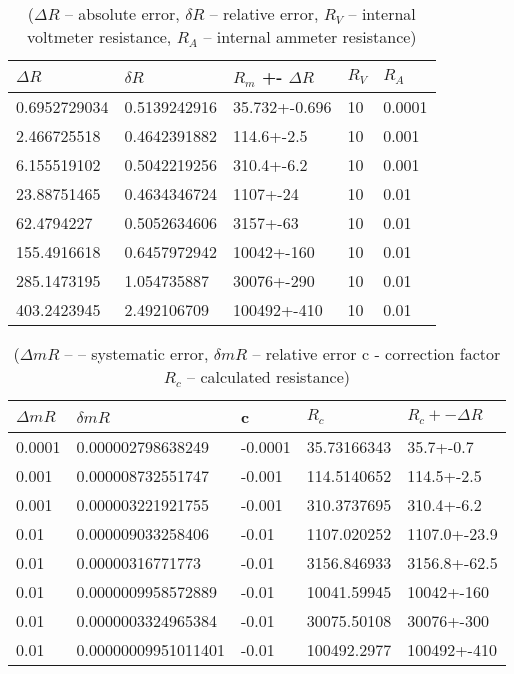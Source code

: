 \begin{table}[!ht]
    \centering
    \begin{tabular}{|l|l|l|l|l|}
    \hline
        $\Delta R$ & $\delta R$ & $R_m$ +- $\Delta R$ & $R_V$ & $R_A$ \\ \hline
        0.6952729034 & 0.5139242916 & 35.732+-0.696 & 10 & 0.0001 \\ \hline
        2.466725518 & 0.4642391882 & 114.6+-2.5 & 10 & 0.001 \\ \hline
        6.155519102 & 0.5042219256 & 310.4+-6.2 & 10 & 0.001 \\ \hline
        23.88751465 & 0.4634346724 & 1107+-24 & 10 & 0.01 \\ \hline
        62.4794227 & 0.5052634606 & 3157+-63 & 10 & 0.01 \\ \hline
        155.4916618 & 0.6457972942 & 10042+-160 & 10 & 0.01 \\ \hline
        285.1473195 & 1.054735887 & 30076+-290 & 10 & 0.01 \\ \hline
        403.2423945 & 2.492106709 & 100492+-410 & 10 & 0.01 \\ \hline
    \end{tabular}
    \caption{($\Delta R$ -- absolute error, $\delta R$ -- relative error, $R_V$ -- internal voltmeter resistance, $R_A$ -- internal ammeter resistance)}
\end{table}

\begin{table}[!ht]
    \centering
    \begin{tabular}{|l|l|l|l|l|}
    \hline
        $\Delta mR$ & $\delta mR$ & c & $R_c$ & $R_c+- \Delta R$ \\ \hline
0.0001 & 0.000002798638249 & -0.0001 & 35.73166343 & 35.7+-0.7 \\ \hline
        0.001 & 0.000008732551747 & -0.001 & 114.5140652 & 114.5+-2.5 \\ \hline
        0.001 & 0.000003221921755 & -0.001 & 310.3737695 & 310.4+-6.2 \\ \hline
        0.01 & 0.000009033258406 & -0.01 & 1107.020252 & 1107.0+-23.9 \\ \hline
        0.01 & 0.00000316771773 & -0.01 & 3156.846933 & 3156.8+-62.5 \\ \hline
        0.01 & 0.0000009958572889 & -0.01 & 10041.59945 & 10042+-160 \\ \hline
        0.01 & 0.0000003324965384 & -0.01 & 30075.50108 & 30076+-300 \\ \hline
        0.01 & 0.00000009951011401 & -0.01 & 100492.2977 & 100492+-410 \\ \hline    \end{tabular}
    \caption{($\Delta mR$ -- – systematic error, $\delta mR$ -- relative error  c - correction factor  $R_c$ -- calculated resistance)}

\end{table}

